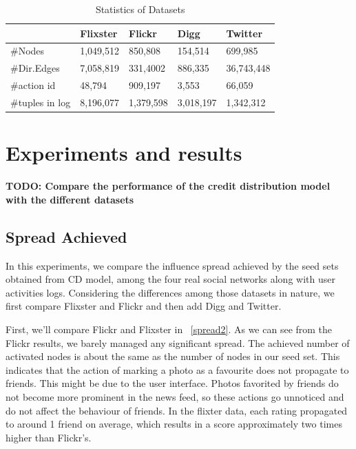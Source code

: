 \documentclass{acm_proc_article-sp}
\begin{document}
 
\begin{table}[]
	\centering
	\caption{Statistics of Datasets}
	\label{table1}
	\begin{tabular}{|l|l|l|l|l|}
		\hline
		& Flixster  & Flickr    & Digg      & Twitter    \\ \hline
		\#Nodes         & 1,049,512 & 850,808   & 154,514   & 699,985    \\ \hline
		\#Dir.Edges     & 7,058,819 & 331,4002  & 886,335   & 36,743,448 \\ \hline
		\#action id     & 48,794    & 909,197   & 3,553     & 66,059     \\ \hline
		\#tuples in log & 8,196,077 & 1,379,598 & 3,018,197 & 1,342,312  \\ \hline
	\end{tabular}
\end{table}


\section{Experiments and results}
\textbf{TODO: Compare the performance of the credit distribution model with the different datasets}

\subsection*{Spread Achieved}
In this experiments, we compare the influence spread achieved by the seed sets obtained from CD model, among the four real social networks along with user activities logs. Considering the differences among those datasets in nature, we first compare Flixster and Flickr and then add Digg and Twitter.

First, we'll compare Flickr and Flixster in  ~\ref{spread2}. As we can see from the Flickr results, we barely managed any significant spread. The achieved number of activated nodes is about the same as the number of nodes in our seed set. This indicates that the action of marking a photo as a favourite does not propagate to friends. This might be due to the user interface. Photos favorited by friends do not become more prominent in the news feed, so these actions go unnoticed and do not affect the behaviour of friends. In the flixter data, each rating propagated to around 1 friend on average, which results in a score approximately two times higher than Flickr's.
\end{document}
